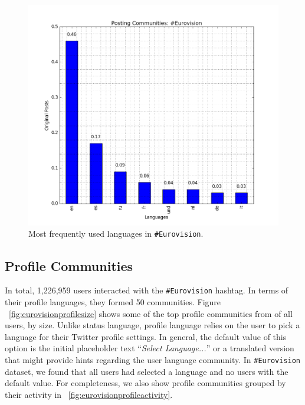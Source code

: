 \begin{figure}[htb]
\centering
\includegraphics[width=\columnwidth]{images/eurovision_langfreq.png}
\caption{Most frequently used languages in {\texttt{\#Eurovision}}.}
\label{fig:eurovisionlangfreq}
\end{figure}

\subsection{Profile Communities}\label{ppcomm}


In total, 1,226,959 users interacted with the {\texttt{\#Eurovision}}
hashtag. In terms of their profile languages, they formed 50
communities. Figure ~\ref{fig:eurovisionprofilesize} shows some of the top profile communities
from of all users, by size. Unlike status language, profile
language relies on the user to pick a language for their Twitter
profile settings. In general, the default value of this option is the
initial placeholder text ``{\emph{Select Language...}}'' or a
translated version that might provide hints regarding the user
language community. In  {\texttt{\#Eurovision}} dataset, we found that 
all users had selected a language and no users with the default value.
For completeness, we also show profile communities grouped by their activity 
in ~\ref{fig:eurovisionprofileactivity}.

